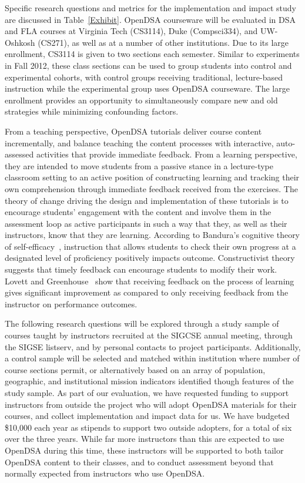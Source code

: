 \documentclass[11pt]{article}
\begin{document}
Specific research questions and metrics for the implementation and
impact study are discussed in Table~\ref{Exhibit}.
OpenDSA courseware will be evaluated in DSA and FLA courses at  
Virginia Tech (CS3114), Duke (Compsci334), and UW-Oshkosh (CS271),
as well as at a number of other institutions.
Due to its large enrollment, CS3114 is given to two sections each
semester.
Similar to experiments in Fall 2012, these class sections can be used
to group students into control and experimental cohorts, with control
groups receiving traditional, lecture-based instruction while the
experimental group uses OpenDSA courseware.
The large enrollment provides an opportunity to simultaneously compare
new and old strategies while minimizing confounding factors.

From a teaching perspective, OpenDSA tutorials deliver course content
incrementally, and balance teaching the content processes with
interactive, auto-assessed activities that provide immediate feedback.
From a learning perspective, they are intended to move students from a
passive stance in a lecture-type classroom setting to an active
position of constructing learning and tracking their own comprehension
through immediate feedback received from the exercises.
The theory of change driving the design and implementation of these
tutorials is to encourage students' engagement with the content
and involve them in the assessment loop as active participants in such
a way that they, as well as their instructors, know that they are
learning.
According to Bandura's cognitive theory of
self-efficacy~\cite{Bandura},
instruction that allows students to check their own progress at a
designated level of proficiency positively impacts outcome.
Constructivist theory suggests that timely feedback
can encourage students to modify their work.
Lovett and Greenhouse~\cite{Lovett} show that receiving feedback on
the process of learning gives significant improvement as compared to
only receiving feedback from the instructor on performance outcomes.

The following research questions will be explored through a study
sample of courses taught by instructors recruited at the SIGCSE annual
meeting, through the SIGSE listserv, and by personal contacts to
project participants.
Additionally, a control sample will be selected and matched
within institution where number of course sections permit,
or alternatively based on an array of population, geographic, and
institutional mission indicators identified though features of the
study sample.
As part of our evaluation, we have requested funding to support
instructors from outside the project who will adopt OpenDSA materials
for their courses, and collect implementation and impact data for us.
We have budgeted \$10,000 each year as stipends to support two outside
adopters, for a total of six over the three years.
While far more instructors than this are expected to use OpenDSA
during this time,
these instructors will be supported to both tailor OpenDSA content
to their classes, and to conduct assessment beyond that
normally expected from instructors who use OpenDSA.
\end{document}
